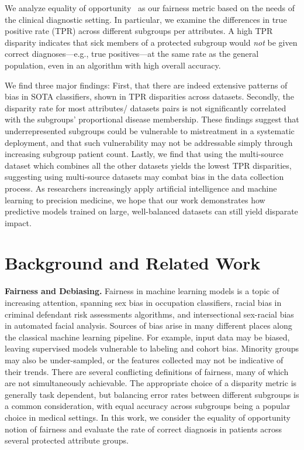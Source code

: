 \documentclass{ws-procs11x85}
\begin{document}
We analyze equality of opportunity~\cite{hardt_equality_2016} as our fairness metric based on the needs of the clinical diagnostic setting.
In particular, we examine the differences in true positive rate (TPR) across different subgroups per attributes. A high TPR disparity indicates that sick members of a protected subgroup would \emph{not} be given correct diagnoses---e.g., true positives---at the same rate as the general population, even in an algorithm with high overall accuracy. 

We find three major findings: First, that there are indeed extensive patterns of bias in SOTA classifiers, shown in TPR disparities across datasets. Secondly, the disparity rate for most attributes/ datasets pairs is not significantly correlated with the subgroups' proportional disease membership. These findings suggest that underrepresented subgroups could be vulnerable to mistreatment in a systematic deployment, and that such vulnerability may not be addressable simply through increasing subgroup patient count. Lastly, we find that using the multi-source dataset which combines all the other datasets yields the lowest TPR disparities, suggesting using multi-source datasets may combat bias in the data collection process.
As researchers increasingly apply artificial intelligence and machine learning to precision medicine, we hope that our work demonstrates how predictive models trained on large, well-balanced datasets can still yield disparate impact. 

\section{Background and Related Work}
\label{sec:Related work}


\textbf{Fairness and Debiasing.} Fairness in machine learning models is a topic of increasing attention, spanning sex bias in occupation classifiers,\cite{de2019bias} racial bias in criminal defendant risk assessments algorithms,\cite{chouldechova_fair_2016} and intersectional sex-racial bias in automated facial analysis.\cite{shade18} Sources of bias arise in many different places along the classical machine learning pipeline. For example, input data may be biased, leaving supervised models vulnerable to labeling and cohort bias.\cite{shade18} Minority groups may also be under-sampled, or the features collected may not be indicative of their trends.\cite{chen_why_2018} There are several conflicting definitions of fairness, many of which are not simultaneously achievable.\cite{kleinberg_inherent_2016} The appropriate choice of a disparity metric is generally task dependent, but balancing error rates between different subgroups is a common consideration, \cite{chouldechova_fair_2016,hardt_equality_2016} with equal accuracy across subgroups being a popular choice in medical settings.\cite{srivastava2019mathematical} In this work, we consider the equality of opportunity notion of fairness and evaluate the rate of correct diagnosis in patients across several protected attribute groups.
\end{document}
